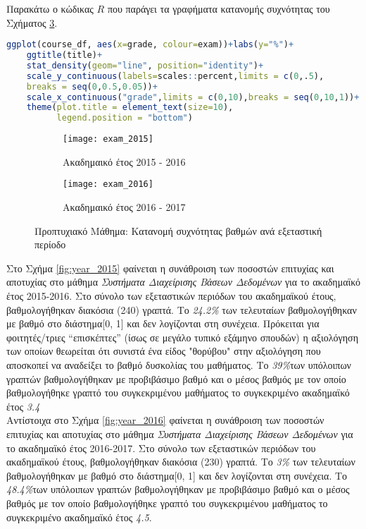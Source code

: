 \documentclass[12pt,a4paper,final]{article}
\begin{document}
Παρακάτω ο κώδικας $R$ που παράγει τα  γραφήματα κατανομής συχνότητας του Σχήματος \ref{fig:exams_propt}.
\begin{lstlisting}[language=R]
ggplot(course_df, aes(x=grade, colour=exam))+labs(y="%")+
    ggtitle(title)+
    stat_density(geom="line", position="identity")+
    scale_y_continuous(labels=scales::percent,limits = c(0,.5),
    breaks = seq(0,0.5,0.05))+
    scale_x_continuous("grade",limits = c(0,10),breaks = seq(0,10,1))+
    theme(plot.title = element_text(size=10),
          legend.position = "bottom")
\end{lstlisting}

\graphicspath{{./figures/post/}}
\begin{figure}[h]
	\centering
	\begin{subfigure}[b]{0.475\textwidth}
		\centering
		\texttt{[image: exam\_2015]}
		\caption{Ακαδημαικό έτος 2015 - 2016}
		\label{fig:exam_2015}
	\end{subfigure}
	\hfill
	\begin{subfigure}[b]{0.475\textwidth}
		\centering
		\texttt{[image: exam\_2016]}
		\caption{Ακαδημαικό έτος 2016 - 2017}
		\label{fig:exam_2016}
	\end{subfigure}
	\caption{Προπτυχιακό Μάθημα: Κατανομή συχνότητας βαθμών ανά εξεταστική περίοδο}
	\label{fig:exams_propt}
\end{figure}
\clearpage


Στο Σχήμα \ref{fig:year_2015} φαίνεται η συνάθροιση  των ποσοστών επιτυχίας και αποτυχίας στο μάθημα \textit{Συστήματα Διαχείρισης Βάσεων Δεδομένων} για το ακαδημαϊκό έτος  2015-2016.
Στο σύνολο των εξεταστικών περιόδων του ακαδημαϊκού έτους, βαθμολογήθηκαν διακόσια (240) γραπτά. Το \textit{24.2\%} των τελευταίων βαθμολογήθηκαν με βαθμό στο διάστημα[0, 1] και δεν λογίζονται στη συνέχεια. Πρόκειται για φοιτητές/τριες “επισκέπτες” (ίσως σε μεγάλο τυπικό εξάμηνο σπουδών) η αξιολόγηση των οποίων θεωρείται ότι συνιστά ένα είδος "θορύβου" στην αξιολόγηση που αποσκοπεί να αναδείξει το βαθμό δυσκολίας του μαθήματος. Το \textit{39\%}των υπόλοιπων γραπτών βαθμολογήθηκαν με προβιβάσιμο βαθμό και ο μέσος βαθμός με τον οποίο βαθμολογήθηκε γραπτό του συγκεκριμένου μαθήματος το συγκεκριμένο ακαδημαϊκό έτος \textit{3.4}\\
Αντίστοιχα στο Σχήμα \ref{fig:year_2016} φαίνεται η συνάθροιση των ποσοστών επιτυχίας και  αποτυχίας στο μάθημα \textit{Συστήματα Διαχείρισης Βάσεων Δεδομένων} για το ακαδημαϊκό έτος  2016-2017.
Στο σύνολο των εξεταστικών περιόδων του ακαδημαϊκού έτους, βαθμολογήθηκαν διακόσια (230) γραπτά. Το \textit{3\%} των τελευταίων βαθμολογήθηκαν με βαθμό στο διάστημα[0, 1] και δεν λογίζονται στη συνέχεια. Το \textit{48.4\%}των υπόλοιπων γραπτών βαθμολογήθηκαν με προβιβάσιμο βαθμό και ο μέσος βαθμός με τον οποίο βαθμολογήθηκε γραπτό του συγκεκριμένου μαθήματος το συγκεκριμένο ακαδημαϊκό έτος \textit{4.5}.\medskip
\end{document}
